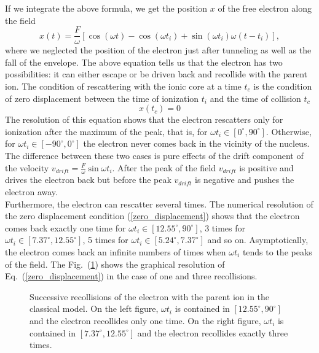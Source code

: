 \documentclass[a4paper]{article}
\begin{document}
\par
If we integrate the above formula, we get the position $x$ of the free electron along the field
\begin{equation}
\label{position_free_motion}
x(t)=\frac{F}{\omega}\left[\cos(\omega t)-\cos(\omega t_{i})+\sin(\omega t_{i})\omega(t-t_{i})\right],
\end{equation}
where we neglected the position of the electron just after tunneling as well as the fall of the envelope.
The above equation tells us that the electron has two possibilities: it can either escape or be driven back and recollide with the parent ion. The condition of rescattering with the ionic core at a time $t_{c}$ is the condition of zero displacement between the time of ionization $t_{i}$ and the time of collision $t_{c}$
\begin{equation}
\label{zero_displacement}
x(t_{c})=0 
\end{equation}
The resolution of this equation shows that the electron rescatters only for ionization after the maximum of the peak, that is, for $\omega t_{i} \in [0^{\circ},90^{\circ}]$. Otherwise, for $\omega t_{i} \in [-90^{\circ},0^{\circ}]$ the electron never comes back in the vicinity of the nucleus. The difference between these two cases is pure effects of the drift component of the velocity $v_{drift}=\frac{F}{\omega}\sin{\omega t_{i}}$. After the peak  of the field $v_{drift}$ is positive and drives the electron back but before the peak $v_{drift}$ is negative and pushes the electron away. \\
Furthermore, the electron can rescatter several times. The numerical resolution of the zero displacement condition (\ref{zero_displacement}) shows that the electron comes back exactly one time for $\omega t_{i} \in [12.55^{\circ},90^{\circ}]$, 3 times for $\omega t_{i} \in [7.37^{\circ},12.55^{\circ}]$, 5 times for $\omega t_{i} \in [5.24^{\circ},7.37^{\circ}]$ and so on. Asymptotically, the electron comes back an infinite numbers of times when $\omega t_{i}$ tends to the peaks of the field. The Fig.~(\ref{successive_recollision}) shows the graphical resolution of Eq.~(\ref{zero_displacement}) in the case of one and three recollisions.
\begin{figure}
\centering
 
 \caption{Successive recollisions of the electron with the parent ion in the classical model. On the left figure, $\omega t_{i}$ is contained in $[12.55^{\circ},90^{\circ}]$ and the electron recollides only one time. On the right figure, $\omega t_{i}$ is contained in $[7.37^{\circ},12.55^{\circ}]$ and the electron recollides exactly three times.}
 \label{successive_recollision} 
\end{figure}
\end{document}
